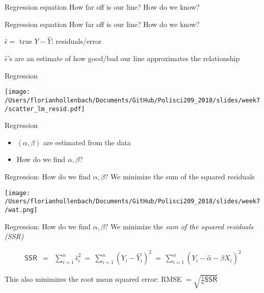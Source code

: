 \documentclass[presentation]{beamer}
\begin{document}
\begin{frame}[label={sec:org6046c62}]{Regression equation}
\Large{How far off is our line? How do we know?}
\end{frame}


\begin{frame}[label={sec:orgc72b019}]{Regression equation}
How far off is our line? How do we know?

\pause
\(\hat\epsilon = \text{ true } Y - \widehat{Y}\): residuals/error

\(\hat\epsilon\)'s are an estimate of how good/bad our line approximates the relationship
\end{frame}

\begin{frame}[label={sec:orgc8b13da}]{Regression}
\begin{center}
\texttt{[image: /Users/florianhollenbach/Documents/GitHub/Polisci209\_2018/slides/week7/scatter\_lm\_resid.pdf]}
\end{center}
\end{frame}



\begin{frame}[label={sec:org3537bf3}]{Regression}
\begin{itemize}
\item \((\alpha, \beta)\) are estimated from the data
\item How do we find \(\alpha, \beta\)?
\end{itemize}
\end{frame}

\begin{frame}[label={sec:org347fe5e}]{Regression: How do we find \(\alpha, \beta\)?}
\alert{We minimize the sum of the squared residuals}

\begin{center}
\texttt{[image: /Users/florianhollenbach/Documents/GitHub/Polisci209\_2018/slides/week7/wat.png]}
\end{center}
\end{frame}



\begin{frame}[label={sec:org306713a}]{Regression: How do we find \(\alpha, \beta\)?}
\alert{We minimize the \emph{sum of the squared residuals (SSR)}}

\begin{eqnarray*}
\textsf{SSR} & = & \sum_{i=1}^n \hat\epsilon_i^2
              \ = \ \sum_{i=1}^n (Y_i - \widehat{Y_{i}})^2
              \ = \  \sum_{i=1}^n (Y_i - \hat\alpha - \hat\beta X_i)^2
\end{eqnarray*}

\pause

This also minimizes the root mean squared error: RMSE \(= \sqrt{\frac{1}{n}\textsf{SSR}}\)
\end{frame}
\end{document}
